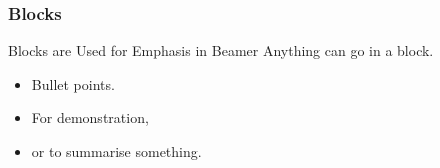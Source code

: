 \documentclass[aspectratio=1610]{beamer}
\begin{document}
%
%
\begin{frame}
\frametitle{Blocks}
   \begin{block}{Blocks are Used for Emphasis in Beamer}
      Anything can go in a block.
      \begin{itemize}
         \item Bullet points.
         \item For demonstration,
         \item or to summarise something.
      \end{itemize}
   \end{block}
\end{frame}
\end{document}
